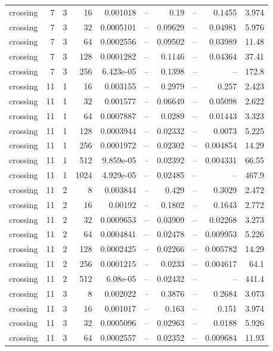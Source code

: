 \begin{tabular}{lrrrrrrrrr}
crossing & 7 & 3 & 16 & 0.001018 & -- & 0.19 & -- & 0.1455 & 3.974 \\
crossing & 7 & 3 & 32 & 0.0005101 & -- & 0.09629 & -- & 0.04981 & 5.976 \\
crossing & 7 & 3 & 64 & 0.0002556 & -- & 0.09502 & -- & 0.03989 & 11.48 \\
crossing & 7 & 3 & 128 & 0.0001282 & -- & 0.1146 & -- & 0.04364 & 37.41 \\
crossing & 7 & 3 & 256 & 6.423e-05 & -- & 0.1398 & -- & -- & 172.8 \\
crossing & 11 & 1 & 16 & 0.003155 & -- & 0.2979 & -- & 0.257 & 2.423 \\
crossing & 11 & 1 & 32 & 0.001577 & -- & 0.06649 & -- & 0.05098 & 2.622 \\
crossing & 11 & 1 & 64 & 0.0007887 & -- & 0.0289 & -- & 0.01443 & 3.323 \\
crossing & 11 & 1 & 128 & 0.0003944 & -- & 0.02332 & -- & 0.0073 & 5.225 \\
crossing & 11 & 1 & 256 & 0.0001972 & -- & 0.02302 & -- & 0.004854 & 14.29 \\
crossing & 11 & 1 & 512 & 9.859e-05 & -- & 0.02392 & -- & 0.004331 & 66.55 \\
crossing & 11 & 1 & 1024 & 4.929e-05 & -- & 0.02485 & -- & -- & 467.9 \\
crossing & 11 & 2 & 8 & 0.003844 & -- & 0.429 & -- & 0.3029 & 2.472 \\
crossing & 11 & 2 & 16 & 0.00192 & -- & 0.1802 & -- & 0.1643 & 2.772 \\
crossing & 11 & 2 & 32 & 0.0009653 & -- & 0.03909 & -- & 0.02268 & 3.273 \\
crossing & 11 & 2 & 64 & 0.0004841 & -- & 0.02478 & -- & 0.009953 & 5.226 \\
crossing & 11 & 2 & 128 & 0.0002425 & -- & 0.02266 & -- & 0.005782 & 14.29 \\
crossing & 11 & 2 & 256 & 0.0001215 & -- & 0.0233 & -- & 0.004617 & 64.1 \\
crossing & 11 & 2 & 512 & 6.08e-05 & -- & 0.02432 & -- & -- & 441.4 \\
crossing & 11 & 3 & 8 & 0.002022 & -- & 0.3876 & -- & 0.2684 & 3.073 \\
crossing & 11 & 3 & 16 & 0.001017 & -- & 0.163 & -- & 0.151 & 3.974 \\
crossing & 11 & 3 & 32 & 0.0005096 & -- & 0.02963 & -- & 0.0188 & 5.926 \\
crossing & 11 & 3 & 64 & 0.0002557 & -- & 0.02352 & -- & 0.009684 & 11.93 \\

\end{tabular}
